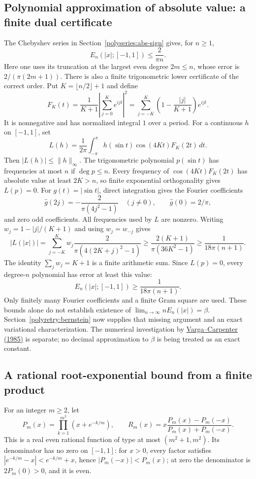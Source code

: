 \documentclass[11pt]{article}
\theoremstyle{remark}
\numberwithin{equation}{section}
\begin{document}
\subsection{Polynomial approximation of absolute value: a finite dual certificate}
The Chebyshev series in Section~\ref{polyseries:abs-sign} gives, for $n\ge1$,
\begin{equation}\label{polyroot:abs-upper}
 E_n(|x|;[-1,1])\le \frac{2}{\pi n}.
\end{equation}
Here one uses its truncation at the largest even degree $2m\le n$,
whose error is $2/(\pi(2m+1))$.
There is also a finite trigonometric lower certificate of the correct
order. Put $K=\lfloor n/2\rfloor+1$ and define
\[
 F_K(t)=\frac1{K+1}\left|\sum_{j=0}^K e^{ijt}\right|^2
 =\sum_{j=-K}^K\left(1-\frac{|j|}{K+1}\right)e^{ijt}.
\]
It is nonnegative and has normalized integral $1$ over a period.
For a continuous $h$ on $[-1,1]$, set
\[
 L(h)=\frac1{2\pi}\int_{-\pi}^{\pi}
 h(\sin t)\cos(4Kt)F_K(2t)\,dt.
\]
Then $|L(h)|\le\|h\|_\infty$. The trigonometric polynomial
$p(\sin t)$ has frequencies at most $n$ if $\deg p\le n$.
Every frequency of $\cos(4Kt)F_K(2t)$ has absolute value at least
$2K>n$, so finite exponential orthogonality gives $L(p)=0$.
For $g(t)=|\sin t|$, direct integration gives the Fourier coefficients
\[
 \widehat g(2j)=-\frac{2}{\pi(4j^2-1)}\quad(j\ne0),
 \qquad \widehat g(0)=2/\pi,
\]
and zero odd coefficients. All frequencies used by $L$ are nonzero.
Writing $w_j=1-|j|/(K+1)$ and using $w_j=w_{-j}$ gives
\[
 |L(|x|)|
 =\sum_{j=-K}^K w_j\frac{2}{\pi(4(2K+j)^2-1)}
 \ge\frac{2(K+1)}{\pi(36K^2-1)}
 \ge\frac1{18\pi(n+1)}.
\]
The identity $\sum_jw_j=K+1$ is a finite arithmetic sum. Since
$L(p)=0$, every degree-$n$ polynomial has error at least this value:
\begin{equation}\label{polyroot:abs-lower}
 E_n(|x|;[-1,1])\ge\frac1{18\pi(n+1)}.
\end{equation}
Only finitely many Fourier coefficients and a finite Gram square are
used. These bounds alone do not establish existence of
$\lim_{n\to\infty}nE_n(|x|)=\beta$. Section~\ref{polyretry:bernstein}
now supplies that missing argument and an exact variational
characterization. The numerical investigation by
\href{https://doi.org/10.1007/BF01890040}{Varga--Carpenter (1985)}
is separate; no decimal approximation to $\beta$ is being treated as
an exact constant.

\subsection{A rational root-exponential bound from a finite product}
For an integer $m\ge2$, let
\[
 P_m(x)=\prod_{k=1}^{m^2}(x+e^{-k/m}),\qquad
 R_m(x)=x\frac{P_m(x)-P_m(-x)}{P_m(x)+P_m(-x)}.
\]
This is a real even rational function of type at most
$(m^2+1,m^2)$. Its denominator has no zero on $[-1,1]$:
for $x>0$, every factor satisfies
$|e^{-k/m}-x|<e^{-k/m}+x$, hence $|P_m(-x)|<P_m(x)$;
at zero the denominator is $2P_m(0)>0$, and it is even.
\end{document}
